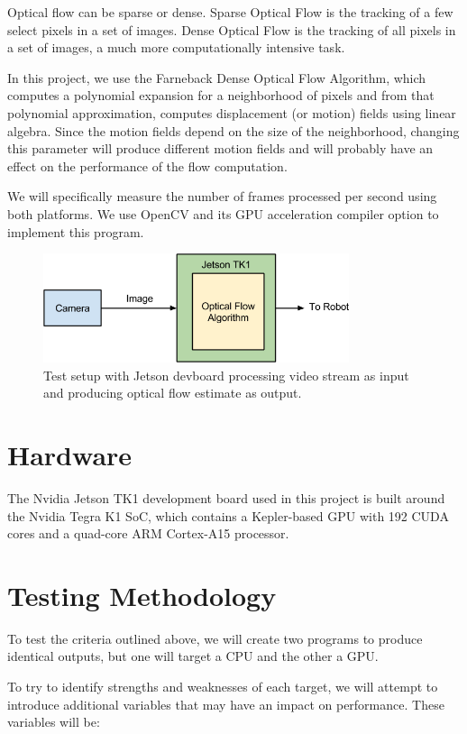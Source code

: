 \documentclass[12pt,letterpaper]{article}
\begin{document}
Optical flow can be sparse or dense. Sparse Optical Flow is the tracking of
a few select pixels in a set of images. Dense Optical Flow is the tracking of
all pixels in a set of images, a much more computationally intensive task.

In this project, we use the Farneback Dense Optical Flow Algorithm, which
computes a polynomial expansion for a neighborhood of pixels and from that
polynomial approximation, computes displacement (or motion) fields using linear
algebra. Since the motion fields depend on the size of the neighborhood,
changing this parameter will produce different motion fields and will probably
have an effect on the performance of the flow computation.

We will specifically measure the number of frames processed per second using
both platforms. We use OpenCV and its GPU acceleration compiler option to 
implement this program.

\begin{figure}[H]
  \centering
  \includegraphics[width=0.8\textwidth]{sys.png}
  \caption{Test setup with Jetson devboard processing video stream as input and producing optical flow estimate as output.}
\end{figure}

\section{Hardware}
The Nvidia Jetson TK1 development board used in this project is built around
the Nvidia Tegra K1 SoC, which contains a Kepler-based GPU with 192 CUDA cores
and a quad-core ARM Cortex-A15 processor.

\section{Testing Methodology}
To test the criteria outlined above, we will create two programs to produce
identical outputs, but one will target a CPU and the other a GPU.

To try to identify strengths and weaknesses of each target, we will attempt to
introduce additional variables that may have an impact on performance. These
variables will be:
\end{document}
